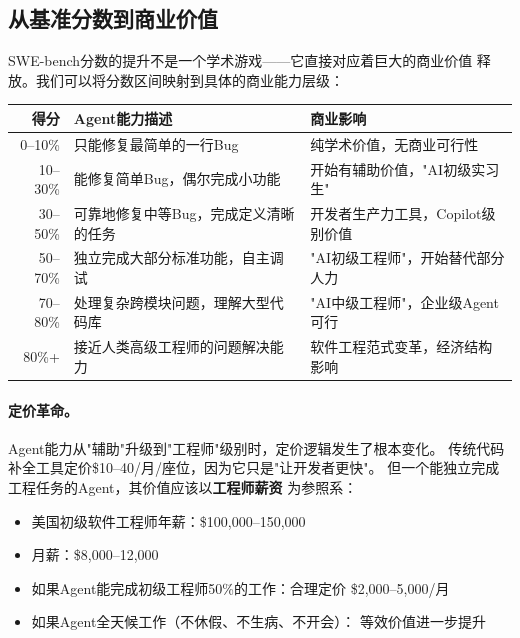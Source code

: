 \subsection{从基准分数到商业价值}
\label{subsec:swebench-business}

SWE-bench分数的提升不是一个学术游戏——它直接对应着巨大的商业价值
释放。我们可以将分数区间映射到具体的商业能力层级：

\begin{keybox}
\small
\begin{tabularx}{\textwidth}{r X X}
\toprule
\rowcolor{figLightGray}
\textbf{得分} & \textbf{Agent能力描述} & \textbf{商业影响} \\
\midrule
0--10\% & 只能修复最简单的一行Bug &
  纯学术价值，无商业可行性 \\
10--30\% & 能修复简单Bug，偶尔完成小功能 &
  开始有辅助价值，"AI初级实习生" \\
30--50\% & 可靠地修复中等Bug，完成定义清晰的任务 &
  开发者生产力工具，Copilot级别价值 \\
50--70\% & 独立完成大部分标准功能，自主调试 &
  "AI初级工程师"，开始替代部分人力 \\
70--80\% & 处理复杂跨模块问题，理解大型代码库 &
  "AI中级工程师"，企业级Agent可行 \\
80\%+ & 接近人类高级工程师的问题解决能力 &
  软件工程范式变革，经济结构影响 \\
\bottomrule
\end{tabularx}
\end{keybox}

\paragraph{定价革命。}
Agent能力从"辅助"升级到"工程师"级别时，定价逻辑发生了根本变化。
传统代码补全工具定价\$10--40/月/座位，因为它只是"让开发者更快"。
但一个能独立完成工程任务的Agent，其价值应该以\textbf{工程师薪资}
为参照系：

\begin{itemize}
  \item 美国初级软件工程师年薪：\$100,000--150,000
  \item 月薪：\$8,000--12,000
  \item 如果Agent能完成初级工程师50\%的工作：合理定价
    \$2,000--5,000/月
  \item 如果Agent全天候工作（不休假、不生病、不开会）：
    等效价值进一步提升
\end{itemize}

